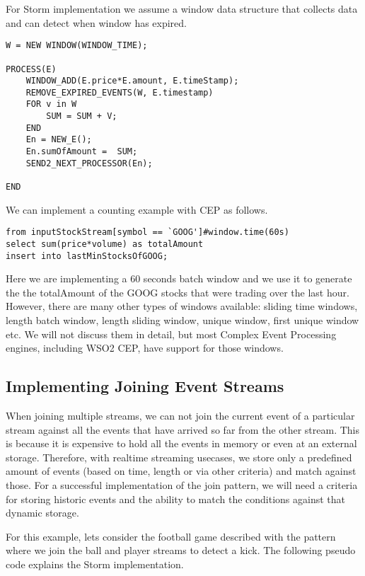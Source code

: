 \documentclass{sig-alternate}
\begin{document}
{For Storm implementation we assume a window data structure that collects data and can detect when window has expired. 

\begin{lstlisting}[mathescape, showstringspaces=false]
W = NEW WINDOW(WINDOW_TIME); 

PROCESS(E) 
	WINDOW_ADD(E.price*E.amount, E.timeStamp); 
	REMOVE_EXPIRED_EVENTS(W, E.timestamp)
	FOR v in W
		SUM = SUM + V; 
	END
	En = NEW_E(); 
	En.sumOfAmount =  SUM; 
	SEND2_NEXT_PROCESSOR(En); 
	
END
\end{lstlisting}


We can implement a counting example with CEP as follows.

\begin{lstlisting}[mathescape, showstringspaces=false]
from inputStockStream[symbol == `GOOG']#window.time(60s)
select sum(price*volume) as totalAmount
insert into lastMinStocksOfGOOG; 
\end{lstlisting}


Here we are implementing a 60 seconds batch window and we use it to generate the the totalAmount of the GOOG stocks that were trading over the last hour. However, there are many other types of windows available:  sliding time windows, length batch window, length sliding window, unique window, first unique window etc.  We will not discuss them in detail, but most Complex Event Processing engines, including WSO2 CEP, have support for those windows. 

\subsection{Implementing Joining Event Streams}
When joining multiple streams, we can not join the current event of a particular stream against all the events that have arrived so far from the other stream. This is because it is expensive to hold all the events in memory or even at an external storage. Therefore, with realtime streaming usecases, we store only a predefined amount of events (based on time, length or via other criteria) and match against those. For a successful implementation of the join pattern, we will need a criteria for storing historic events and the ability to match the conditions against that dynamic storage. 

For this example, lets consider the football game described with the pattern where we join the ball and player streams to detect a kick. The following pseudo code explains the Storm implementation. 

}
\end{document}
